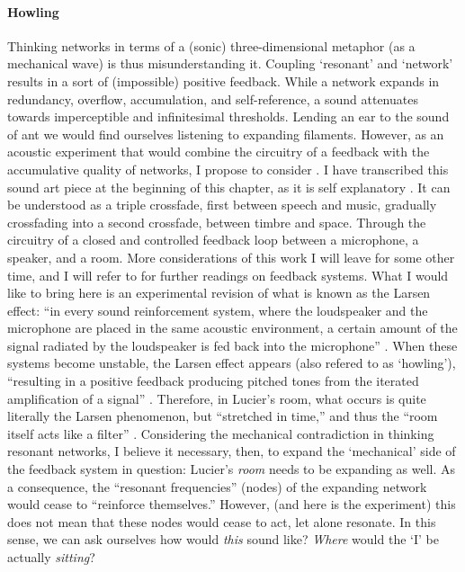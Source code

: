 \paragraph{Howling}
Thinking networks in terms of a (sonic) three-dimensional metaphor (as a mechanical wave) is thus misunderstanding it. Coupling `resonant' and `network' results in a sort of (impossible) positive feedback. While a network expands in redundancy, overflow, accumulation, and self-reference, a sound attenuates towards imperceptible and infinitesimal thresholds. Lending an ear to the sound of \gls{ant} we would find ourselves listening to expanding filaments. However, as an acoustic experiment that would combine the circuitry of a feedback with the accumulative quality of networks, I propose to consider  . I have transcribed this sound art piece at the beginning of this chapter, as it is self explanatory . It can be understood as a triple crossfade, first between speech and music, gradually crossfading into a second crossfade, between timbre and space. Through the circuitry of a closed and controlled feedback loop between a microphone, a speaker, and a room. More considerations of this work I will leave for some other time, and I will refer to \textcite{icmc/bbp2372.2012.006} for further readings on feedback systems. What I would like to bring here is an experimental revision of what is known as the Larsen effect: ``in every sound reinforcement system, where the loudspeaker and the microphone are placed in the same acoustic environment, a certain amount of the signal radiated by the loudspeaker is fed back into the microphone'' \parencite[11]{Kro11:Aco}. When these systems become unstable, the Larsen effect appears (also refered to as `howling'), ``resulting in a positive feedback producing pitched tones from the iterated amplification of a signal'' \parencite[31]{icmc/bbp2372.2012.006}. Therefore, in Lucier's room, what occurs is quite literally the Larsen phenomenon, but ``stretched in time,'' and thus the ``room itself acts like a filter'' \parencite[34]{icmc/bbp2372.2012.006}. Considering the mechanical contradiction in thinking resonant networks, I believe it necessary, then, to expand the `mechanical' side of the feedback system in question: Lucier's \textit{room} needs to be expanding as well. As a consequence, the ``resonant frequencies'' (nodes) of the expanding network would cease to ``reinforce themselves.'' However, (and here is the experiment) this does not mean that these nodes would cease to act, let alone resonate. In this sense, we can ask ourselves how would \textit{this} sound like? \textit{Where} would the `I' be actually \textit{sitting}?


